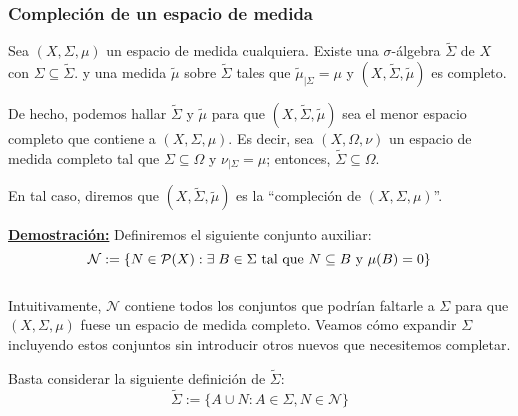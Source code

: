 \documentclass[12pt,a4paper]{article}
\newcounter{unit}[section]
\newcounter{chapter}[unit]
\renewcommand{\theunit}{\arabic{unit}}
\renewcommand{\thechapter}{\arabic{chapter}}
\renewcommand{\thesubsubsection}{\theunit.\thechapter.\arabic{subsubsection}}
\newcommand{\result}[1]{%
  \subsubsection{#1}%
  \label{result:\thesubsubsection}
}
\newcommand{\dem}{
    \noindent \underline{\textbf{Demostración:}}
}
\begin{document}
\vspace{6mm}
\result{Compleción de un espacio de medida}
\hspace{3mm} Sea $(X, \Sigma, \mu)$ un espacio de medida cualquiera. Existe una $\sigma$-álgebra $\tilde{\Sigma}$ de $X$ con $\Sigma \subseteq \tilde{\Sigma}$.
y una medida $\tilde{\mu}$ sobre $\tilde{\Sigma}$ tales que $\tilde{\mu}_{|\Sigma} = \mu$
\hspace{1mm} y \hspace{1mm} $(X, \tilde{\Sigma},\tilde{\mu})$ es completo.

\vspace{2mm}
De hecho, podemos hallar $\tilde{\Sigma}$ y $\tilde{\mu}$ para que $(X, \tilde{\Sigma}, \tilde{\mu})$ sea el
menor espacio completo que contiene a $(X, \Sigma, \mu)$. Es decir, sea $(X, \Omega, \nu)$ un espacio de medida completo
tal que $\Sigma \subseteq \Omega$ \hspace{1mm} y \hspace{1mm} $\nu_{|\Sigma} = \mu$; entonces, $\tilde{\Sigma} \subseteq \Omega$.

\vspace{2mm} \noindent
En tal caso, diremos que $(X, \tilde{\Sigma}, \tilde{\mu})$ es la ``compleción de $(X, \Sigma, \mu)$''.

\newpage
\dem Definiremos el siguiente conjunto auxiliar: \\[-3ex]
$$\mathcal{N} := \{N \in \mathcal{P}(X) : \exists \hspace{1mm} B \in \Sigma \text{ tal que } N \subseteq B \text{ y } \mu(B) = 0\} $$
\\[-4ex]
Intuitivamente, $\mathcal{N}$ contiene todos los conjuntos que podrían faltarle a $\Sigma$ para que $(X, \Sigma, \mu)$ fuese un espacio de medida completo.
Veamos cómo expandir $\Sigma$ incluyendo estos conjuntos sin introducir otros nuevos que necesitemos completar.

\vspace{2mm} \noindent
Basta considerar la siguiente definición de $\tilde{\Sigma}$: \\[-2.5ex]
$$\tilde{\Sigma} := \{A \cup N : A \in \Sigma, N \in \mathcal{N}\}$$
\end{document}
